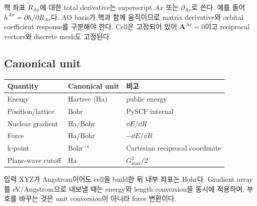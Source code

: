 핵 좌표 $R_{Ax}$에 대한 total derivative는 superscript $Ax$ 또는
$\partial_{Ax}$로 쓴다. 예를 들어 $h^{Ax}=\partial h/\partial R_{Ax}$다. AO basis가
핵과 함께 움직이므로 matrix derivative와 orbital coefficient response를 구분해야 한다.
Cell은 고정되어 있어 $\mathbf A^{Ax}=0$이고 reciprocal vectors와 discrete mesh도
고정된다.

\subsection{Canonical unit}

\begin{center}
\begin{tabular}{lll}
\toprule
Quantity & Canonical unit & 비고 \\
\midrule
Energy & Hartree (Ha) & public energy \\
Position/lattice & Bohr & PySCF internal \\
Nuclear gradient & Ha/Bohr & $\dd E/\dd R$ \\
Force & Ha/Bohr & $-\dd E/\dd R$ \\
k-point & Bohr$^{-1}$ & Cartesian reciprocal coordinate \\
Plane-wave cutoff & Ha & $G_{\max}^2/2$ \\
\bottomrule
\end{tabular}
\end{center}

입력 XYZ가 Angstrom이어도 cell을 build한 뒤 내부 좌표는 Bohr다. Gradient array를
eV/Angstrom으로 내보낼 때는 energy와 length conversion을 동시에 적용하며, 부호를
바꾸는 것은 unit conversion이 아니라 force 변환이다.
